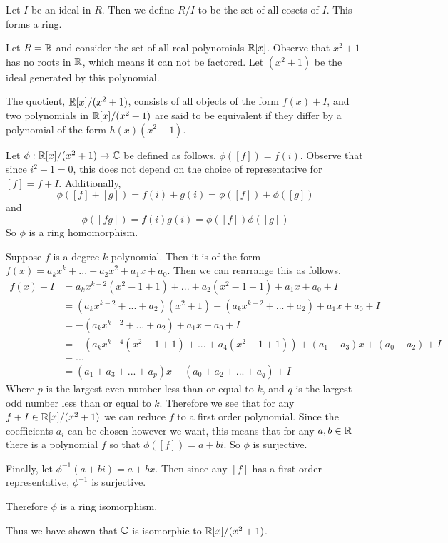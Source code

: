 \begin{defn}
    Let $I$ be an ideal in $R$. Then we define $R/I$ to be the set of all cosets of $I$. This forms a ring.
\end{defn}
\begin{example}
    Let $R = \operatorname{\mathbb{R}}$ and consider the set of all real polynomials $\operatorname{\mathbb{R}}[x]$. Observe that $x^2 +1$ has no roots in $\operatorname{\mathbb{R}}$, which means it can not be factored. Let $(x^2+1)$ be the ideal generated by this polynomial.
    
    The quotient, $\operatorname{\mathbb{R}}[x]/(x^2+1)$, consists of all objects of the form $f(x)+I$, and two polynomials in $\operatorname{\mathbb{R}}[x]/(x^2+1)$ are said to be equivalent if they differ by a polynomial of the form $h(x)(x^2+1)$.

    Let $\phi : \operatorname{\mathbb{R}}[x]/(x^2+1)\to \operatorname{\mathbb{C}}$ be defined as follows. $\phi([f]) = f(i)$. Observe that since $i^2-1=0$, this does not depend on the choice of representative for $[f]=f+I$. Additionally, \[\phi([f]+[g])= f(i)+g(i) = \phi([f])+\phi([g])\]
    and \[\phi([fg]) = f(i)g(i) = \phi([f])\phi([g])\]
    So $\phi$ is a ring homomorphism.

    Suppose $f$ is a degree $k$ polynomial. Then it is of the form $f(x) = a_k x^k + ... + a_2 x^2 + a_1 x + a_0$. Then we can rearrange this as follows. 
    \begin{align*}f(x) +I&= a_kx^{k-2}(x^2 -1 +1) + ... + a_2(x^2-1+1) + a_1 x + a_0 + I\\
    &= (a_k x^{k-2}+...+a_2)(x^2+1) - (a_k x^{k-2} + ... + a_2) + a_1 x + a_0+I\\
    &=  - (a_k x^{k-2} + ... + a_2) + a_1 x + a_0 + I\\
    &= -(a_k x^{k-4}(x^2-1+1)+...+a_4(x^2-1+1)) + (a_1-a_3)x+(a_0-a_2) + I\\
    &=...\\
    &= (a_1\pm a_3\pm ...\pm a_{p})x+(a_0\pm a_2\pm ...\pm a_q) + I
    \end{align*}   
    Where $p$ is the largest even number less than or equal to $k$, and $q$ is the largest odd number less than or equal to $k$. Therefore we see that for any $f +I\in \operatorname{\mathbb{R}}[x]/(x^2+1)$ we can reduce $f$ to a first order polynomial. Since the coefficients $a_i$ can be chosen however we want, this means that for any $a,b\in \operatorname{\mathbb{R}}$ there is a polynomial $f$ so that $\phi([f]) = a+bi$. So $\phi$ is surjective.

    Finally, let $\phi^{-1}(a+bi) = a+bx$. Then since any $[f]$ has a first order representative, $\phi^{-1}$ is surjective. 
    
    Therefore $\phi$ is a ring isomorphism.

    Thus we have shown that $\operatorname{\mathbb{C}}$ is isomorphic to $\operatorname{\mathbb{R}}[x]/(x^2+1)$.
\end{example}
